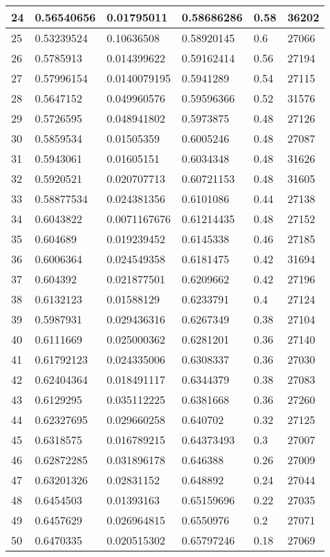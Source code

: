 \begin{longtable}{|l|l|l|l|l|l|}
24 & 0.56540656 & 0.01795011 & 0.58686286 & 0.58 & 36202 \\ \hline 
25 & 0.53239524 & 0.10636508 & 0.58920145 & 0.6 & 27066 \\ \hline 
26 & 0.5785913 & 0.014399622 & 0.59162414 & 0.56 & 27194 \\ \hline 
27 & 0.57996154 & 0.0140079195 & 0.5941289 & 0.54 & 27115 \\ \hline 
28 & 0.5647152 & 0.049960576 & 0.59596366 & 0.52 & 31576 \\ \hline 
29 & 0.5726595 & 0.048941802 & 0.5973875 & 0.48 & 27126 \\ \hline 
30 & 0.5859534 & 0.01505359 & 0.6005246 & 0.48 & 27087 \\ \hline 
31 & 0.5943061 & 0.01605151 & 0.6034348 & 0.48 & 31626 \\ \hline 
32 & 0.5920521 & 0.020707713 & 0.60721153 & 0.48 & 31605 \\ \hline 
33 & 0.58877534 & 0.024381356 & 0.6101086 & 0.44 & 27138 \\ \hline 
34 & 0.6043822 & 0.0071167676 & 0.61214435 & 0.48 & 27152 \\ \hline 
35 & 0.604689 & 0.019239452 & 0.6145338 & 0.46 & 27185 \\ \hline 
36 & 0.6006364 & 0.024549358 & 0.6181475 & 0.42 & 31694 \\ \hline 
37 & 0.604392 & 0.021877501 & 0.6209662 & 0.42 & 27196 \\ \hline 
38 & 0.6132123 & 0.01588129 & 0.6233791 & 0.4 & 27124 \\ \hline 
39 & 0.5987931 & 0.029436316 & 0.6267349 & 0.38 & 27104 \\ \hline 
40 & 0.6111669 & 0.025000362 & 0.6281201 & 0.36 & 27140 \\ \hline 
41 & 0.61792123 & 0.024335006 & 0.6308337 & 0.36 & 27030 \\ \hline 
42 & 0.62404364 & 0.018491117 & 0.6344379 & 0.38 & 27083 \\ \hline 
43 & 0.6129295 & 0.035112225 & 0.6381668 & 0.36 & 27260 \\ \hline 
44 & 0.62327695 & 0.029660258 & 0.640702 & 0.32 & 27125 \\ \hline 
45 & 0.6318575 & 0.016789215 & 0.64373493 & 0.3 & 27007 \\ \hline 
46 & 0.62872285 & 0.031896178 & 0.646388 & 0.26 & 27009 \\ \hline 
47 & 0.63201326 & 0.02831152 & 0.648892 & 0.24 & 27044 \\ \hline 
48 & 0.6454503 & 0.01393163 & 0.65159696 & 0.22 & 27035 \\ \hline 
49 & 0.6457629 & 0.026964815 & 0.6550976 & 0.2 & 27071 \\ \hline 
50 & 0.6470335 & 0.020515302 & 0.65797246 & 0.18 & 27069 \\ \hline 
\end{longtable}